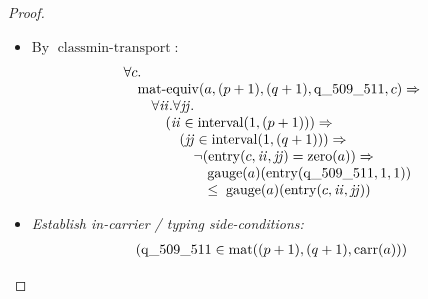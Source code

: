 \documentclass[11pt]{article}
\theoremstyle{plain}
\begin{document}
\begin{proof}
\begin{itemize}[leftmargin=2.8em, itemsep=4pt, parsep=1pt]
  \item[\textbf{33--36}] By $\operatorname{classmin\text{-}transport}$:
\begin{equation*}
\begin{array}{@{}l@{}} \forall c. \\ \quad \operatorname{mat\text{-}equiv}(a, (p + 1), (q + 1), \operatorname{q\_509\_511}, c) \Rightarrow  \\ \quad \quad \forall \mathit{ii}. \forall \mathit{jj}. \\ \quad \quad \quad (\mathit{ii} \in \operatorname{interval}(1, (p + 1))) \Rightarrow  \\ \quad \quad \quad \quad (\mathit{jj} \in \operatorname{interval}(1, (q + 1))) \Rightarrow  \\ \quad \quad \quad \quad \quad \neg (\operatorname{entry}(c, \mathit{ii}, \mathit{jj}) = \operatorname{zero}(a)) \Rightarrow  \\ \quad \quad \quad \quad \quad \quad \operatorname{gauge}(a)(\operatorname{entry}(\operatorname{q\_509\_511}, 1, 1)) \\ \quad \quad \quad \quad \quad \quad \leq\; \operatorname{gauge}(a)(\operatorname{entry}(c, \mathit{ii}, \mathit{jj})) \end{array}
\end{equation*}

  \item[\textbf{37}] \emph{Establish in-carrier / typing side-conditions:}
\begin{equation*}
\begin{array}{@{}l@{}}
(\operatorname{q\_509\_511} \in \operatorname{mat}((p + 1), (q + 1), \operatorname{carr}(a)))
\end{array}
\end{equation*}


\end{itemize}
\end{proof}
\end{document}
